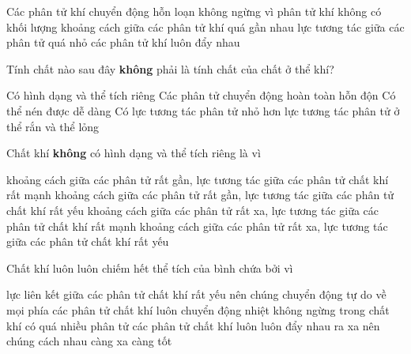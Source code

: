 \begin{ex}
	Các phân tử khí chuyển động hỗn loạn không ngừng vì
	\choice
	{phân tử khí không có khối lượng}
	{khoảng cách giữa các phân tử khí quá gần nhau}
	{\True lực tương tác giữa các phân tử quá nhỏ}
	{các phân tử khí luôn đẩy nhau}
	\end{ex}

\begin{ex}
	Tính chất nào sau đây \textbf{không} phải là tính chất của chất ở thể khí?
	
	\choice
	{\True Có hình dạng và thể tích riêng}
	{Các phân tử chuyển động hoàn toàn hỗn độn}
	{Có thể nén được dễ dàng}
	{Có lực tương tác phân tử nhỏ hơn lực tương tác phân tử ở thể rắn và thể lỏng}
	\end{ex}

\begin{ex}
	Chất khí \textbf{không} có hình dạng và thể tích riêng là vì
	
	\choice
	{khoảng cách giữa các phân tử rất gần, lực tương tác giữa các phân tử chất khí rất mạnh}
	{khoảng cách giữa các phân tử rất gần, lực tương tác giữa các phân tử chất khí rất yếu}
	{khoảng cách giữa các phân tử rất xa, lực tương tác giữa các phân tử chất khí rất mạnh}
	{\True khoảng cách giữa các phân tử rất xa, lực tương tác giữa các phân tử chất khí rất yếu}
	\end{ex}

\begin{ex}
	Chất khí luôn luôn chiếm hết thể tích của bình chứa bởi vì
	
	\choice
	{\True lực liên kết giữa các phân tử chất khí rất yếu nên chúng chuyển động tự do về mọi phía}
	{các phân tử chất khí luôn chuyển động nhiệt không ngừng}
	{trong chất khí có quá nhiều phân tử}
	{các phân tử chất khí luôn luôn đẩy nhau ra xa nên chúng cách nhau càng xa càng tốt}
	\end{ex}

